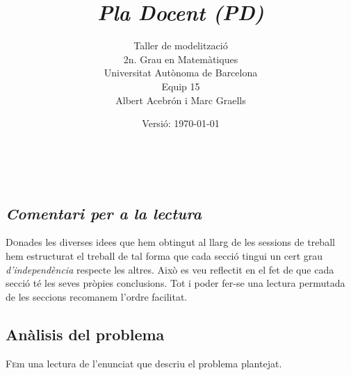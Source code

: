 \documentclass[10pt,twocolumn]{article}
\title{\emph{\color{redviolet!75!black}Pla Docent {(PD)}}}
\author{ Taller de modelització \\ 2n. Grau en  Matemàtiques \\ Universitat Autònoma de Barcelona \\ Equip 15 \\ { \color{gray!3} Albert Acebrón i Marc Graells} }
\date{Versió: \today}
\newcommand{\esp}{\text{ }}
\begin{document}
	
\maketitle
{
\centering
\begin{abstract}
	
\end{abstract}
}
\newpage
$$
\esp
$$
\\ 
\newpage

\tableofcontents
\vspace{5mm}
\newpage
\begin{tcolorbox}[colframe=white,colback=redviolet!20,sharp corners=all,size=minimal,halign=center,valign=center]
	\section{\textit{Comentari per a la lectura}}
\end{tcolorbox}
\lettrine{D}onades les  diverses idees  que hem obtingut al llarg de les sessions de treball hem estructurat el treball de tal forma que cada secció tingui un cert grau \textit{d'independència} respecte les altres. Això es veu reflectit en el fet de que cada secció té les seves pròpies conclusions. Tot i poder fer-se una lectura permutada de les seccions recomanem l'ordre facilitat. 
\\ 
\newpage
\begin{tcolorbox}[colframe=white,colback=redviolet!20,sharp corners=all,size=minimal,halign=center,valign=center]
\section{Anàlisis del problema}
\end{tcolorbox}
\lettrine{F}em una lectura de l'enunciat que descriu el problema plantejat. 
\end{document}
